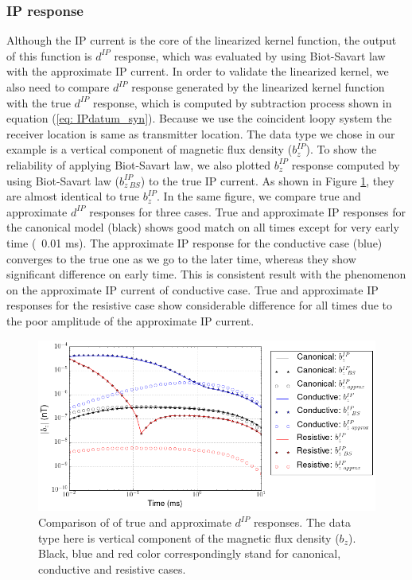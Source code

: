 \documentclass[a4paper, 11pt]{article}
\newcommand{\dip}{d^{IP}}
\begin{document}
\clearpage

\subsubsection{IP response}
Although the IP current is the core of the linearized kernel function, the output of this function is $\dip$ response, which was evaluated by using Biot-Savart law with the approximate IP current. In order to validate the linearized kernel, we also need to compare $\dip$ response generated by the linearized kernel function with the true $\dip$ response, which is computed by subtraction process shown in equation (\ref{eq: IPdatum_syn}). Because we use the coincident loopy system the receiver location is same as transmitter location. The data type we chose in our example is a vertical component of magnetic flux density ($b^{IP}_z$). To show the reliability of applying Biot-Savart law, we also plotted $b^{IP}_z$ response computed by using Biot-Savart law ($b^{IP}_{z \ BS}$) to the true IP current. As shown in Figure \ref{F:compIPresp}, they are almost identical to true $b^{IP}_z$. In the same figure, we compare true and approximate $\dip$ responses for three cases. True and approximate IP responses for the canonical model  (black) shows good match on all times except for very early time (~0.01 ms). The approximate IP response for the conductive case (blue)  converges to the true one as we go to the later time, whereas they show significant difference on early time. This is consistent result with the phenomenon on the approximate IP current of conductive case. True and approximate IP responses for the resistive case show considerable difference for all times due to the poor amplitude of the approximate IP current. 

\begin{figure}[htb]
  \centering  \includegraphics[width=1.0\textwidth]{figures/threecasesresp/compIPresp.png}
  \caption{Comparison of of true and approximate $\dip$ responses. The data type here is vertical component of the magnetic flux density ($b_z$). Black, blue and red color correspondingly stand for canonical, conductive and resistive cases. }
  \label{F:compIPresp}
\end{figure}
\clearpage
\end{document}
